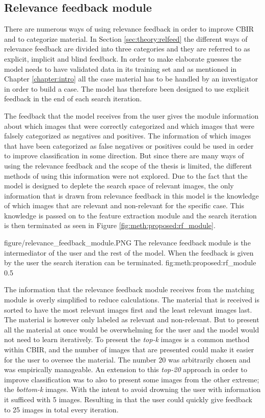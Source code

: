 
\subsection{Relevance feedback module}
\label{sec:method:proposed:rf}
There are numerous ways of using relevance feedback in order to improve CBIR and to categorize material. In Section \ref{sec:theory:relfeed} the different ways of relevance feedback are divided into three categories and they are referred to as explicit, implicit and blind feedback. 
In order to make elaborate guesses the model needs to have validated data in its training set and as mentioned in Chapter \ref{chapter:intro} all the case material has to be handled by an investigator in order to build a case. The model has therefore been designed to use explicit feedback in the end of each search iteration.

The feedback that the model receives from the user gives the module information about which images that were correctly categorized and which images that were falsely categorized as negatives and positives. The information of which images that have been categorized as false negatives or positives could be used in order to improve classification in some direction. But since there are many ways of using the relevance feedback and the scope of the thesis is limited, the different methods of using this information were not explored. Due to the fact that the model is designed to deplete the search space of relevant images, the only information that is drawn from relevance feedback in this model is the knowledge of which images that are relevant and non-relevant for the specific case. This knowledge is passed on to the feature extraction module and the search iteration is then terminated as seen in Figure \ref{fig:meth:proposed:rf_module}.

\singlefigurenear
{figure/relevance_feedback_module.PNG}
{The relevance feedback module is the intermediator of the user and the rest of the model. When the feedback is given by the user the search iteration can be terminated.}
{fig:meth:proposed:rf_module}
{0.5}

The information that the relevance feedback module receives from the matching module is overly simplified to reduce calculations. The material that is received is sorted to have the most relevant images first and the least relevant images last. The material is however only labeled as relevant and non-relevant. But to present all the material at once would be overwhelming for the user and the model would not need to learn iteratively. 
To present the \emph{top-k} images is a common method within CBIR, and the number of images that are presented could make it easier for the user to oversee the material. The number 20 was arbitrarily chosen and was empirically manageable. An extension to this \emph{top-20} approach in order to improve classification was to also to present some images from the other extreme; the \emph{bottom-k} images. With the intent to avoid drowning the user with information it sufficed with 5 images. Resulting in that the user could quickly give feedback to 25 images in total every iteration. 
